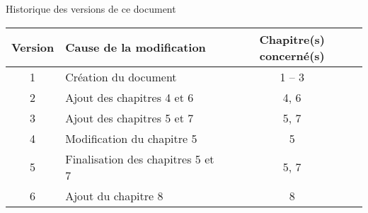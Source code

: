 \cleardoublepage
\begingroup
	\thispagestyle{empty}
	\centering
	\par\normalfont\sffamily\selectfont
	\Large{Historique des versions de ce document}
	
	\vspace*{2cm}
	{\large
		\begin{tabular}{cp{}c}
			\toprule
			Version & Cause de la modification & Chapitre(s) concerné(s)\\
			\midrule
			1 & Création du document & 1 -- 3\\
			2 & Ajout des chapitres 4 et 6 & 4, 6\\
			3 & Ajout des chapitres 5 et 7 & 5, 7\\
			4 & Modification du chapitre 5 & 5\\
			5 & Finalisation des chapitres 5 et 7 & 5, 7\\ 
			6 & Ajout du chapitre 8 & 8\\
			\bottomrule
		\end{tabular}
	}
\endgroup